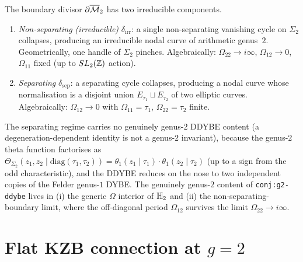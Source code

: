 \begin{remark}
\label{rem:g2-ddybe-check}
The boundary divisor $\partial\overline{\mathcal{M}}_2$ has two
irreducible components.
\begin{enumerate}[label=\textup{(\alph*)}]
\item \emph{Non-separating (irreducible)} $\delta_{\mathrm{irr}}$:
 a single non-separating vanishing cycle on $\Sigma_2$
 collapses, producing an irreducible nodal curve of
 arithmetic genus~$2$. Geometrically, one handle of
 $\Sigma_2$ pinches. Algebraically:
 $\Omega_{22}\to i\infty$, $\Omega_{12}\to 0$,
 $\Omega_{11}$ fixed (up to $SL_2(\mathbb{Z})$ action).
\item \emph{Separating} $\delta_{\mathrm{sep}}$: a separating
 cycle collapses, producing a nodal curve whose normalisation
 is a disjoint union $E_{\tau_1}\sqcup E_{\tau_2}$ of two
 elliptic curves. Algebraically: $\Omega_{12}\to 0$
 with $\Omega_{11}=\tau_1$, $\Omega_{22}=\tau_2$ finite.
\end{enumerate}
The separating regime carries no genuinely
genus-$2$ DDYBE content (a degeneration-dependent identity is
not a genus-$2$ invariant), because the genus-$2$ theta function
factorises as
$\Theta_{\Sigma_2}(z_1, z_2 \mid
\mathrm{diag}(\tau_1,\tau_2))
= \theta_1(z_1\mid\tau_1)\cdot\theta_1(z_2\mid\tau_2)$
(up to a sign from the odd characteristic), and the DDYBE
reduces on the nose to two independent copies of the
Felder genus-$1$ DYBE. The genuinely genus-$2$ content of
\texttt{conj:g2-ddybe} lives in (i) the generic $\Omega$
interior of $\mathbb{H}_2$ and (ii) the non-separating-boundary
limit, where the off-diagonal period $\Omega_{12}$ survives
the limit $\Omega_{22}\to i\infty$.
\end{remark}

\section{Flat KZB connection at $g=2$}
\label{sec:g2-kzb-flat}

